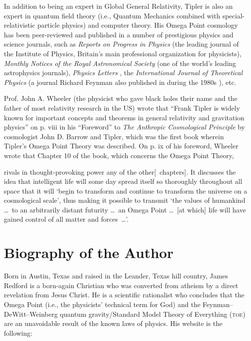 \documentclass[letterpaper,12pt]{article}
\newenvironment{squote}
  {\small\quote}
  {\endquote\normalsize}
\begin{document}
In addition to being an expert in Global General Relativity, Tipler is also an expert in quantum field theory (i.e., Quantum Mechanics combined with special-relativistic particle physics) and computer theory. His Omega Point cosmology has been peer-reviewed and published in a number of prestigious physics and science journals, such as \emph{Reports on Progress in Physics} \cite{Tipler2005} (the leading journal of the Institute of Physics, Britain's main professional organization for physicists), \emph{Monthly Notices of the Royal Astronomical Society} \cite{TiplerEtAl2000} (one of the world's leading astrophysics journals), \emph{Physics Letters} \cite{Tipler1992}, the \emph{International Journal of Theoretical Physics} \cite{Tipler1986} (a journal Richard Feynman also published in during the 1980s \cite{Feynman1982}), etc.

Prof. John A. Wheeler (the physicist who gave black holes their name and the father of most relativity research in the US) wrote that ``Frank Tipler is widely known for important concepts and theorems in general relativity and gravitation physics'' on p. viii in his ``Foreword'' to \emph{The Anthropic Cosmological Principle} \cite{BarrowTipler1986} by cosmologist John D. Barrow and Tipler, which was the first book wherein Tipler's Omega Point Theory was described. On p. ix of his foreword, Wheeler wrote that Chapter 10 of the book, which concerns the Omega Point Theory,

\begin{squote}
rivals in thought-provoking power any of the other[~chapters]. It discusses the idea that intelligent life will some day spread itself so thoroughly throughout all space that it will `begin to transform and continue to transform the universe on a cosmological scale', thus making it possible to transmit `the values of humankind \ldots\ to an arbitrarily distant futurity \ldots\ an Omega Point \ldots\ [at which] life will have gained control of all matter and forces~\ldots'.
\end{squote}

\section{Biography of the Author}
\label{sec:BiographyOfTheAuthor}

Born in Austin, Texas and raised in the Leander, Texas hill country, James Redford is a born-again Christian who was converted from atheism by a direct revelation from Jesus Christ. He is a scientific rationalist who concludes that the Omega Point (i.e., the physicists' technical term for God) and the Feynman--DeWitt--Weinberg quantum gravity/Standard Model Theory of Everything (\textsc{toe}) are an unavoidable result of the known laws of physics. His website is the following:
\end{document}

